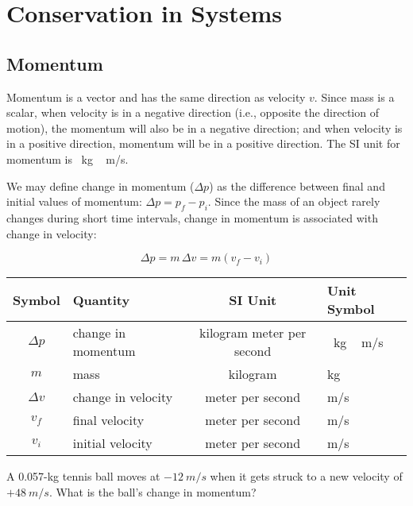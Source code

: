 \documentclass[main.tex]{subfiles}
\begin{document}
\section{Conservation in Systems}

\subsection{Momentum}

Momentum is a vector and has the same direction as velocity $v$. Since mass is a scalar, when velocity is in a negative direction (i.e., opposite the direction of motion), the momentum will also be in a negative direction; and when velocity is in a positive direction, momentum will be in a positive direction. The SI unit for momentum is \SI{}{kg\,m/s}.
\vspace{1em}

We may define \gls{change in momentum} ($\Delta p$) as the difference between final and initial values of momentum: $\Delta p = p_f - p_i$. Since the mass of an object rarely changes during short time intervals, change in momentum is associated with change in velocity:

\begin{equation} \label{dq0Ujw}
    \Delta p = m\,\Delta v = m \left(v_f - v_i\right)
\end{equation}

\begin{center}
    \begin{tabular}{cl|cl}
    \hline
    \textbf{Symbol} & \textbf{Quantity} & \textbf{SI Unit} & \textbf{Unit Symbol}  \\
    \hline\hline
    \rule{0pt}{2.5ex}
        $\Delta p$ & change in momentum & kilogram meter per second & \SI{}{kg\,m/s}\\
        $m$ & mass & kilogram & kg\\
        $\Delta v$ & change in velocity & meter per second & m/s\\
    \hline
        $v_f$ & final velocity & meter per second & m/s\\
        $v_i$ & initial velocity & meter per second & m/s\\
    \hline
    \end{tabular}
\end{center}

\begin{example} \label{EvkSMv}
    A 0.057-kg tennis ball moves at $-\SI{12}{m/s}$ when it gets struck to a new velocity of $+\SI{48}{m/s}$. What is the ball's change in momentum?
\end{example}
\end{document}
